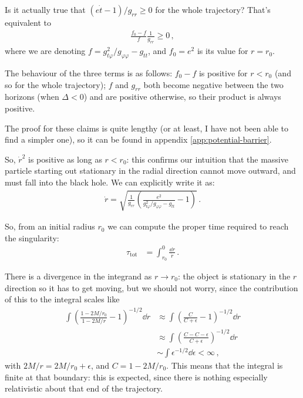 \documentclass[main.tex]{subfiles}
\begin{document}
Is it actually true that \((e \dot{t} - 1) / g_{rr} \geq 0\) for the whole trajectory? That's equivalent to 
%
\begin{align}
\frac{f_0 - f }{f} \frac{1}{g_{rr} } \geq 0 
\,,
\end{align}
%
where we are denoting \(f = g_{t \varphi }^2 / g_{\varphi \varphi} - g_{tt}\), and \(f_0 = e^2\) is its value for \(r = r_0 \).

The behaviour of the three terms is as follows: \(f_0 - f\) is positive for \(r < r_0 \) (and so for the whole trajectory); 
\(f\) and \(g_{rr}\) both become negative between the two horizons (when \(\Delta < 0\)) and are positive otherwise, so their product is always positive.

The proof for these claims is quite lengthy (or at least, I have not been able to find a simpler one), so it can be found in appendix \ref{app:potential-barrier}.

So, \(\dot{r}^2\) is positive as long as \(r < r_0 \): this confirms our intuition that the massive particle starting out stationary in the radial direction cannot move outward, and must fall into the black hole.
We can explicitly write it as:
%
\begin{align}
\dot{r} = \sqrt{\frac{1}{g_{rr}} \left( \frac{e^2}{g_{t \varphi }^2 / g_{\varphi \varphi } - g_{tt}} - 1\right)}
\,.
\end{align}

So, from an initial radius \(r_0 \) we can compute the proper time required to reach the singularity: 
%
\begin{align}
\tau _{\text{tot}} &= \int_{r_0}^{0} \frac{ \dd{r}}{\dot{r}} 
\,.
\end{align}

There is a divergence in the integrand as \(r \to r_0 \): the object is stationary in the \(r\) direction so it has to get moving, but we should not worry, since the contribution of this to the integral scales like 
%
\begin{align}
\int \left(\frac{1 - 2M / r_0 }{1 - 2M / r} -1 \right)^{-1/2} \dd{r} &\approx \int \left(\frac{C }{C+ \epsilon } -1 \right)^{-1/2} \dd{r}  \\
&\approx \int \left(\frac{C - C - \epsilon }{C + \epsilon } \right)^{-1/2} \dd{r}  \\
&\sim \int \epsilon^{-1/2} \dd{\epsilon } < \infty 
\,,
\end{align}
%
with \(2M/r = 2M/r_0 + \epsilon \), and \(C = 1 - 2M/r_0 \).
This means that the integral is finite at that boundary: this is expected, since there is nothing especially relativistic about that end of the trajectory.
\end{document}
